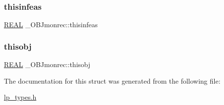 \mbox{\label{struct___o_b_jmonrec_aec9fd81f46ca26550444fa7c6d60baaf}} 
\subsubsection{\texorpdfstring{thisinfeas}{thisinfeas}}
{\footnotesize\ttfamily \hyperlink{lp__lib_8h_a92bd5e363d131fa73669358edb232dce}{R\+E\+AL} \+\_\+\+O\+B\+Jmonrec\+::thisinfeas}

\mbox{\label{struct___o_b_jmonrec_a7397e96fa41acc59cd38928c55a627ca}} 
\subsubsection{\texorpdfstring{thisobj}{thisobj}}
{\footnotesize\ttfamily \hyperlink{lp__lib_8h_a92bd5e363d131fa73669358edb232dce}{R\+E\+AL} \+\_\+\+O\+B\+Jmonrec\+::thisobj}



The documentation for this struct was generated from the following file\+:\begin{DoxyCompactItemize}
\item 
\hyperlink{lp__types_8h}{lp\+\_\+types.\+h}\end{DoxyCompactItemize}
